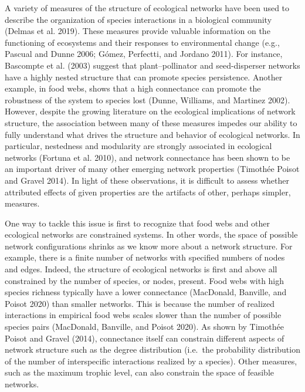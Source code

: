 \documentclass[10pt,oneside]{article}
\begin{document}
A variety of measures of the structure of ecological networks have been
used to describe the organization of species interactions in a
biological community (Delmas et al. 2019). These measures provide
valuable information on the functioning of ecosystems and their
responses to environmental change (e.g., Pascual and Dunne 2006; Gómez,
Perfectti, and Jordano 2011). For instance, Bascompte et al. (2003)
suggest that plant--pollinator and seed-disperser networks have a highly
nested structure that can promote species persistence. Another example,
in food webs, shows that a high connectance can promote the robustness
of the system to species lost (Dunne, Williams, and Martinez 2002).
However, despite the growing literature on the ecological implications
of network structure, the association between many of these measures
impedes our ability to fully understand what drives the structure and
behavior of ecological networks. In particular, nestedness and
modularity are strongly associated in ecological networks (Fortuna et
al. 2010), and network connectance has been shown to be an important
driver of many other emerging network properties (Timothée Poisot and
Gravel 2014). In light of these observations, it is difficult to assess
whether attributed effects of given properties are the artifacts of
other, perhaps simpler, measures.

One way to tackle this issue is first to recognize that food webs and
other ecological networks are constrained systems. In other words, the
space of possible network configurations shrinks as we know more about a
network structure. For example, there is a finite number of networks
with specified numbers of nodes and edges. Indeed, the structure of
ecological networks is first and above all constrained by the number of
species, or nodes, present. Food webs with high species richness
typically have a lower connectance (MacDonald, Banville, and Poisot
2020) than smaller networks. This is because the number of realized
interactions in empirical food webs scales slower than the number of
possible species pairs (MacDonald, Banville, and Poisot 2020). As shown
by Timothée Poisot and Gravel (2014), connectance itself can constrain
different aspects of network structure such as the degree distribution
(i.e.~the probability distribution of the number of interspecific
interactions realized by a species). Other measures, such as the maximum
trophic level, can also constrain the space of feasible networks.
\end{document}
